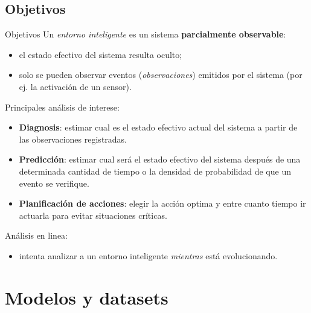 \documentclass[9pt, handout]{beamer}
\begin{document}
    \subsection{Objetivos}
      \begin{frame}{Objetivos}
        \pause
        Un \textit{entorno inteligente} es un sistema \textbf{parcialmente observable}:
        \pause
        \begin{itemize}
          \item el estado efectivo del sistema resulta oculto;
          \pause
          \item solo se pueden observar eventos (\textit{observaciones}) emitidos por el sistema (por ej. la activación de un sensor).
        \end{itemize}
        
        \vspace{1em}
        \pause
        Principales análisis de interese:
        \pause
        \begin{itemize}
          \item \textbf{Diagnosis}: estimar cual es el estado efectivo actual del sistema a partir de las observaciones registradas.
          \pause
          \item \textbf{Predicción}: estimar cual será el estado efectivo del sistema después de una determinada cantidad de tiempo o la densidad de probabilidad de que un evento se verifique.
          \pause
          \item \textbf{Planificación de acciones}: elegir la acción optima y entre cuanto tiempo ir actuarla para evitar situaciones críticas.
        \end{itemize}
        
        \vspace{1em}
        \pause
        Análisis en linea:
        \pause
        \begin{itemize}
          \item intenta analizar a un entorno inteligente \textit{mientras} está evolucionando.
        \end{itemize}
      \end{frame}
    
  \section{Modelos y datasets}
\end{document}

